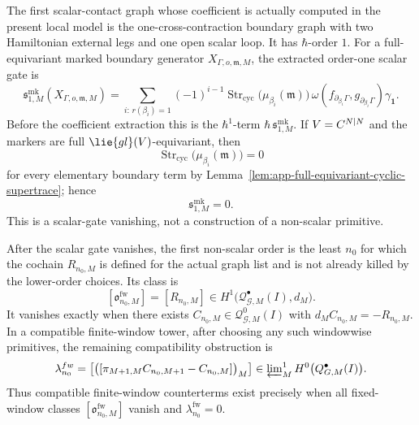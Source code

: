 \begin{thm}
  The first scalar-contact graph whose coefficient is actually computed
  in the present local model is the one-cross-contraction boundary graph
  with two Hamiltonian external legs and one open scalar loop.  It has
  \(\hbar\)-order \(1\).  For a full-equivariant marked boundary
  generator \(X_{\Gamma,o,\mathfrak m,M}\), the extracted order-one
  scalar gate is
  \[
    \mathfrak s^{\mathrm{mk}}_{1,M}
      (X_{\Gamma,o,\mathfrak m,M})
      =
    \sum_{i:\,r(\beta_i)=1}
      (-1)^{i-1}
      \operatorname{Str}_{\mathrm{cyc}}
        \bigl(\mu_{\beta_i}(\mathfrak m)\bigr)\,
      \omega(f_{\partial_{\beta_i}\Gamma},
             g_{\partial_{\beta_i}\Gamma})
      \gamma_{\mathbf 1}.
  \]
  Before the coefficient extraction this is the
  \(\hbar^1\)-term
  \(\hbar\,\mathfrak s^{\mathrm{mk}}_{1,M}\).
  If \(V=\C^{N|N}\) and the markers are full
  \(\lie{gl}(V)\)-equivariant, then
  \[
    \operatorname{Str}_{\mathrm{cyc}}
      \bigl(\mu_{\beta_i}(\mathfrak m)\bigr)=0
  \]
  for every elementary boundary term by
  Lemma~\ref{lem:app-full-equivariant-cyclic-supertrace}; hence
  \[
    \mathfrak s^{\mathrm{mk}}_{1,M}=0.
  \]
  This is a scalar-gate vanishing, not a construction of a non-scalar
  primitive.

  After the scalar gate vanishes, the first non-scalar order is the least
  \(n_0\) for which the cochain \(R_{n_0,M}\) is defined for the actual
  graph list and is not already killed by the lower-order choices.  Its
  class is
  \[
    [\mathfrak o^{\mathrm{fw}}_{n_0,M}]
      =
    [R_{n_0,M}]
      \in
    H^1\bigl(\mathcal Q^\bullet_{\mathcal G,M}(I),d_M\bigr).
  \]
  It vanishes exactly when there exists
  \(C_{n_0,M}\in\mathcal Q^0_{\mathcal G,M}(I)\) with
  \(d_M C_{n_0,M}=-R_{n_0,M}\).  In a compatible finite-window tower,
  after choosing any such windowwise primitives, the remaining
  compatibility obstruction is
  \[
    \lambda^{\mathrm{fw}}_{n_0}
      =
    \left[
      \bigl(
        [\pi_{M+1,M}C_{n_0,M+1}-C_{n_0,M}]
      \bigr)_M
    \right]
      \in
    \varprojlim\nolimits^1_M
    H^0\bigl(\mathcal Q^\bullet_{\mathcal G,M}(I)\bigr).
  \]
  Thus compatible finite-window counterterms exist precisely when all
  fixed-window classes \([\mathfrak o^{\mathrm{fw}}_{n_0,M}]\) vanish and
  \(\lambda^{\mathrm{fw}}_{n_0}=0\).


\end{thm}
